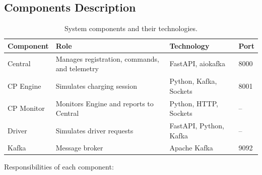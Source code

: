 \documentclass[12pt,a4paper]{article}
\begin{document}
\subsection{Components Description}
\begin{table}[h!]
\centering
\begin{tabular}{|l|l|l|l|}
\hline
\textbf{Component} & \textbf{Role} & \textbf{Technology} & \textbf{Port} \\ \hline
Central & Manages registration, commands, and telemetry & FastAPI, aiokafka & 8000 \\ \hline
CP Engine & Simulates charging session & Python, Kafka, Sockets & 8001 \\ \hline
CP Monitor & Monitors Engine and reports to Central & Python, HTTP, Sockets & -- \\ \hline
Driver & Simulates driver requests & FastAPI, Python, Kafka & -- \\ \hline
Kafka & Message broker & Apache Kafka & 9092 \\ \hline
\end{tabular}
\caption{System components and their technologies.}
\end{table}
Responsibilities of each component:
\end{document}
